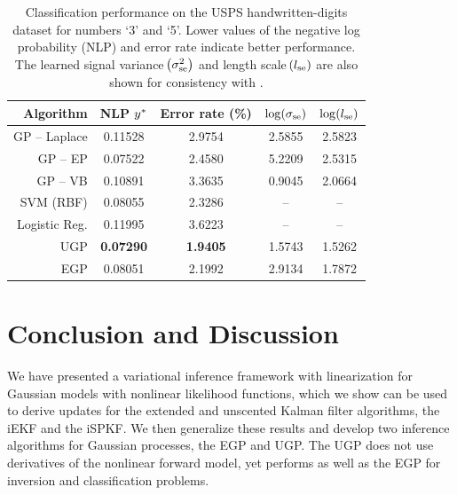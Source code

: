 \documentclass{article} %
\begin{document}
\begin{table}[tb]
    \centering

    \caption[]{Classification performance on the USPS handwritten-digits
        dataset for numbers `3' and `5'. Lower values of the negative log
        probability (NLP) and error rate indicate better performance. The
        learned signal variance $\!\left({\sigma^{2}_\text{se}}\right)$ and length
        scale $\!\left({l_\text{se}}\right)$ are also shown for consistency with
        \cite[\S 3.7.3]{Rasmussen2006}.}

    \footnotesize
    \begin{tabular}{r| c c c c}
        Algorithm & NLP $y^{*}$ & Error rate (\%) 
            & $\log\!\left({\sigma_\text{se}}\right)$ & $\log\!\left({l_\text{se}}\right)$ \\
        \toprule
        GP -- Laplace & 0.11528 & 2.9754 & 2.5855 & 2.5823 \\
        GP -- EP & 0.07522 & 2.4580 & 5.2209 & 2.5315 \\
        GP -- VB & 0.10891 & 3.3635 & 0.9045 & 2.0664 \\ 
        SVM (RBF) & 0.08055 & 2.3286 & -- & -- \\
        Logistic Reg. & 0.11995 & 3.6223 & -- & -- \\
        \midrule
        UGP & \textbf{0.07290} & \textbf{1.9405} & 1.5743 & 1.5262 \\
        EGP & 0.08051 & 2.1992 & 2.9134 & 1.7872 \\
        \bottomrule
    \end{tabular}
    \label{tab:class}
\end{table}


\section{Conclusion and Discussion}

We have presented a variational inference framework with linearization for
Gaussian models with nonlinear likelihood functions, which we show can be used
to derive updates for the extended and unscented Kalman filter algorithms, the
iEKF and the iSPKF. We then generalize these results and develop two inference
algorithms for Gaussian processes, the EGP and UGP. The UGP does not use
derivatives of the nonlinear forward model, yet performs as well as the EGP for
inversion and classification problems. 
\end{document}
